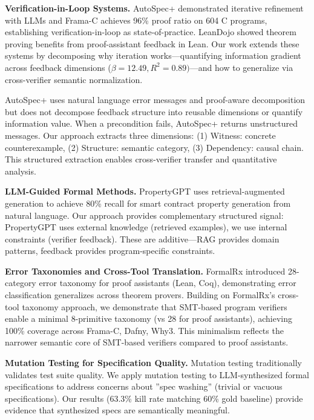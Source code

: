 
\textbf{Verification-in-Loop Systems.} AutoSpec+ demonstrated iterative refinement with LLMs and Frama-C achieves 96\% proof ratio on 604 C programs, establishing verification-in-loop as state-of-practice. LeanDojo showed theorem proving benefits from proof-assistant feedback in Lean. Our work extends these systems by decomposing why iteration works---quantifying information gradient across feedback dimensions ($\beta =12.49, R^{2}=0.89)$---and how to generalize via cross-verifier semantic normalization.

AutoSpec+ uses natural language error messages and proof-aware decomposition but does not decompose feedback structure into reusable dimensions or quantify information value. When a precondition fails, AutoSpec+ returns unstructured messages. Our approach extracts three dimensions: (1) Witness: concrete counterexample, (2) Structure: semantic category, (3) Dependency: causal chain. This structured extraction enables cross-verifier transfer and quantitative analysis.

\textbf{LLM-Guided Formal Methods.} PropertyGPT uses retrieval-augmented generation to achieve 80\% recall for smart contract property generation from natural language. Our approach provides complementary structured signal: PropertyGPT uses external knowledge (retrieved examples), we use internal constraints (verifier feedback). These are additive---RAG provides domain patterns, feedback provides program-specific constraints.

\textbf{Error Taxonomies and Cross-Tool Translation.} FormalRx introduced 28-category error taxonomy for proof assistants (Lean, Coq), demonstrating error classification generalizes across theorem provers. Building on FormalRx's cross-tool taxonomy approach, we demonstrate that SMT-based program verifiers enable a minimal 8-primitive taxonomy (vs 28 for proof assistants), achieving 100\% coverage across Frama-C, Dafny, Why3. This minimalism reflects the narrower semantic core of SMT-based verifiers compared to proof assistants.

\textbf{Mutation Testing for Specification Quality.} Mutation testing traditionally validates test suite quality. We apply mutation testing to LLM-synthesized formal specifications to address concerns about ''spec washing'' (trivial or vacuous specifications). Our results (63.3\% kill rate matching 60\% gold baseline) provide evidence that synthesized specs are semantically meaningful.
